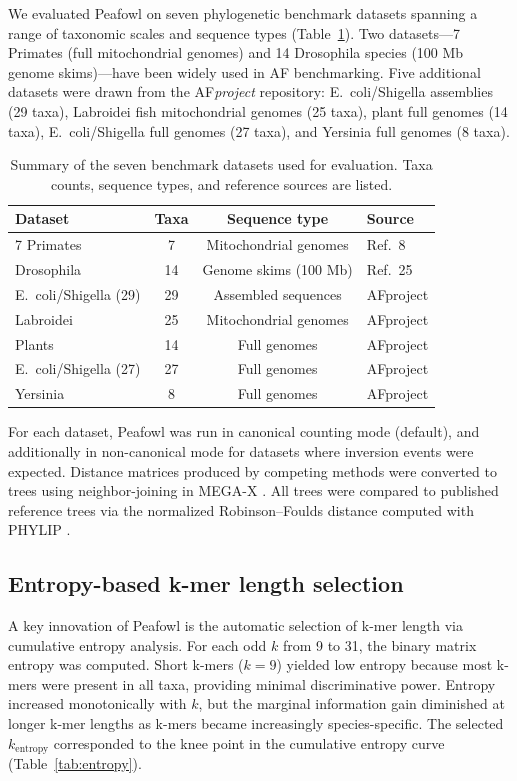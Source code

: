 \documentclass[11pt]{article}
\begin{document}
We evaluated Peafowl on seven phylogenetic benchmark datasets spanning a range of taxonomic scales and sequence types (Table~\ref{tab:datasets}). Two datasets---7 Primates (full mitochondrial genomes) and 14 Drosophila species (100 Mb genome skims)---have been widely used in AF benchmarking. Five additional datasets were drawn from the AF\emph{project} repository: E.~coli/Shigella assemblies (29 taxa), Labroidei fish mitochondrial genomes (25 taxa), plant full genomes (14 taxa), E.~coli/Shigella full genomes (27 taxa), and Yersinia full genomes (8 taxa).

\begin{table}[H]
\centering
\caption{Summary of the seven benchmark datasets used for evaluation. Taxa counts, sequence types, and reference sources are listed.}
\label{tab:datasets}
\begin{tabular}{lccl}
\toprule
\textbf{Dataset} & \textbf{Taxa} & \textbf{Sequence type} & \textbf{Source} \\
\midrule
7 Primates & 7 & Mitochondrial genomes & Ref.~8 \\
Drosophila & 14 & Genome skims (100 Mb) & Ref.~25 \\
E.~coli/Shigella (29) & 29 & Assembled sequences & AFproject \\
Labroidei & 25 & Mitochondrial genomes & AFproject \\
Plants & 14 & Full genomes & AFproject \\
E.~coli/Shigella (27) & 27 & Full genomes & AFproject \\
Yersinia & 8 & Full genomes & AFproject \\
\bottomrule
\end{tabular}
\end{table}

For each dataset, Peafowl was run in canonical counting mode (default), and additionally in non-canonical mode for datasets where inversion events were expected. Distance matrices produced by competing methods were converted to trees using neighbor-joining in MEGA-X \citep{kumar2018}. All trees were compared to published reference trees via the normalized Robinson--Foulds distance computed with PHYLIP \citep{felsenstein2005}.

\subsection{Entropy-based k-mer length selection}

A key innovation of Peafowl is the automatic selection of k-mer length via cumulative entropy analysis. For each odd $k$ from 9 to 31, the binary matrix entropy was computed. Short k-mers ($k = 9$) yielded low entropy because most k-mers were present in all taxa, providing minimal discriminative power. Entropy increased monotonically with $k$, but the marginal information gain diminished at longer k-mer lengths as k-mers became increasingly species-specific. The selected $k_{\text{entropy}}$ corresponded to the knee point in the cumulative entropy curve (Table~\ref{tab:entropy}).
\end{document}
